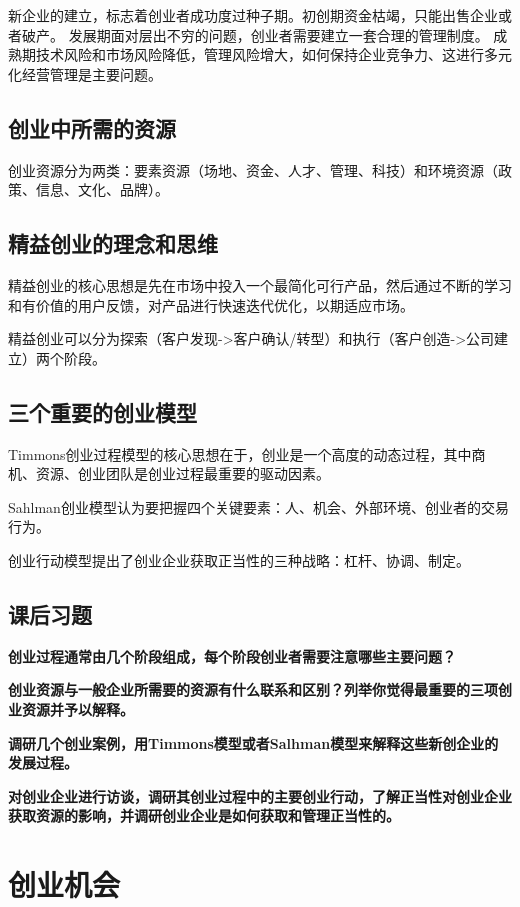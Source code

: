 \documentclass[a4paper, UTF8]{ctexart}
\begin{document}
		新企业的建立，标志着创业者成功度过种子期。初创期资金枯竭，只能出售企业或者破产。
		发展期面对层出不穷的问题，创业者需要建立一套合理的管理制度。
		成熟期技术风险和市场风险降低，管理风险增大，如何保持企业竞争力、这进行多元化经营管理是主要问题。

	\subsection{创业中所需的资源}
		创业资源分为两类：要素资源（场地、资金、人才、管理、科技）和环境资源（政策、信息、文化、品牌）。

	\subsection{精益创业的理念和思维}
		精益创业的核心思想是先在市场中投入一个最简化可行产品，然后通过不断的学习和有价值的用户反馈，对产品进行快速迭代优化，以期适应市场。

		精益创业可以分为探索（客户发现->客户确认/转型）和执行（客户创造->公司建立）两个阶段。

	\subsection{三个重要的创业模型}
		Timmons创业过程模型的核心思想在于，创业是一个高度的动态过程，其中商机、资源、创业团队是创业过程最重要的驱动因素。

		Sahlman创业模型认为要把握四个关键要素：人、机会、外部环境、创业者的交易行为。

		创业行动模型提出了创业企业获取正当性的三种战略：杠杆、协调、制定。

	\subsection{课后习题}
		\textbf{创业过程通常由几个阶段组成，每个阶段创业者需要注意哪些主要问题？}

		\textbf{创业资源与一般企业所需要的资源有什么联系和区别？列举你觉得最重要的三项创业资源并予以解释。}

		\textbf{调研几个创业案例，用Timmons模型或者Salhman模型来解释这些新创企业的发展过程。}

		\textbf{对创业企业进行访谈，调研其创业过程中的主要创业行动，了解正当性对创业企业获取资源的影响，并调研创业企业是如何获取和管理正当性的。}

\section{创业机会}
\end{document}
